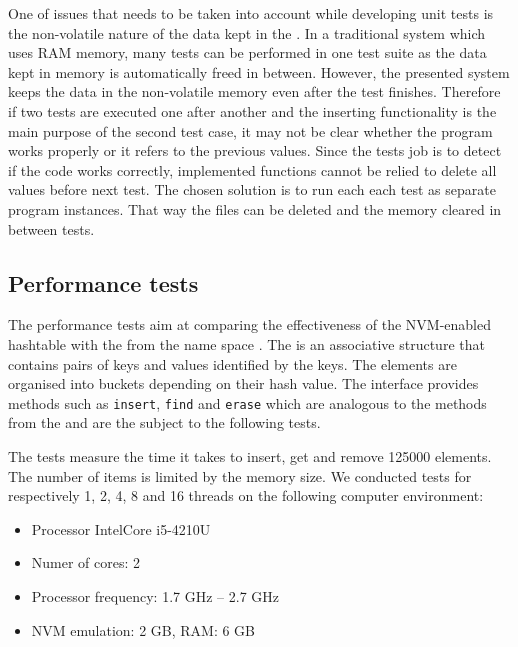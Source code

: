         One of issues that needs to be taken into account while developing unit tests is the non-volatile nature of the data kept in the \NvmHashMap. 
        In a traditional system which uses RAM memory, many tests can be performed in one test suite as the data kept in memory is automatically freed in between.
        However, the presented system keeps the data in the non-volatile memory even after the test finishes.
        Therefore if two tests are executed one after another and the inserting functionality is the main purpose of the second test case, it may not be clear whether the program works properly or it refers to the previous values. 
        Since the tests job is to detect if the code works correctly, implemented functions cannot be relied to delete all values before next test. 
        The chosen solution is to run each each test as separate program instances.
        That way the files can be deleted and the memory cleared in between tests.

    \subsection{Performance tests}
        The performance tests aim at comparing the effectiveness of the NVM-enabled hashtable with the \unorderedMap from the \std name space \cite{UnorderedMapCpp}. 
        The \unorderedMap is an associative structure that contains pairs of keys and values identified by the keys. 
        The elements are organised into buckets depending on their hash value. 
        The interface provides methods such as \texttt{insert}, \texttt{find} and \texttt{erase} which are analogous to the methods from the \NvmHashMap and are the subject to the following tests.
        
        The tests measure the time it takes to insert, get and remove 125000 elements. 
        The number of items is limited by the memory size. 
        We conducted tests for respectively 1, 2, 4, 8 and 16 threads on the following computer environment:
        \begin{itemize}
            \item Processor IntelCore i5-4210U 
            \item Numer of cores: 2
            \item Processor frequency: 1.7 GHz -- 2.7 GHz
            \item NVM emulation: 2 GB, RAM: 6 GB
            
        \end{itemize}
        
